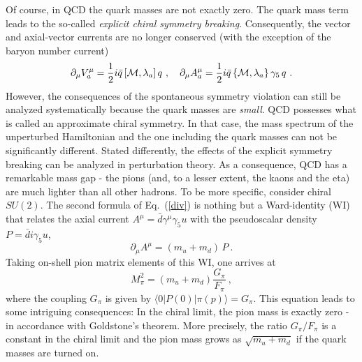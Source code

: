 \documentclass[aps,rmp,nofootinbib,twocolumn,floatfix]{revtex4}
\newcommand{\beq}{\begin{equation}}
\newcommand{\eeq}{\end{equation}}
\begin{document}
Of course, in QCD the quark masses are not exactly zero. The quark mass term leads
to the so-called {\em explicit chiral symmetry breaking}. Consequently, the
vector and axial-vector currents are no longer conserved (with the exception
of the baryon number current)
\beq\label{div}
\partial_\mu V_a^\mu = \dfrac{1}{2} i \bar q \, [{\cal M},\lambda_a ]\, q~, \quad
\partial_\mu A_a^\mu = \dfrac{1}{2} i \bar q \, \{{\cal M},\lambda_a \} \, \gamma_5\, q~.
\eeq
However, the consequences of the spontaneous symmetry violation  can still be
analyzed systematically because the quark masses are {\em small}. QCD
possesses what is called an approximate chiral symmetry. In that case, the mass spectrum
of the unperturbed Hamiltonian and the one including the quark masses can not be
significantly different. Stated differently, the effects of the explicit symmetry
breaking can be analyzed in perturbation theory. 
As a consequence, QCD has a remarkable mass gap
- the pions (and, to a lesser extent,
the kaons and the eta) are much lighter than all other hadrons.  To be more
specific, consider chiral $SU(2)$. The second formula of Eq.~(\ref{div}) is
nothing but a Ward-identity (WI) that relates the axial current $A^\mu =  \bar d
\gamma^\mu \gamma_5 u$ with the pseudoscalar density $P = \bar d i \gamma_5
u$,
\beq
\partial_\mu A^\mu = (m_u + m_d)\, P~.
\eeq
Taking on-shell pion matrix elements of this WI, one arrives at
\beq\label{pimass}
M_\pi^2 = (m_u + m_d) \frac{G_\pi}{F_\pi}~,
\eeq
where the coupling $G_\pi$ is given by $\langle 0 | P(0)| \pi(p)\rangle =
G_\pi $. This equation leads to some intriguing consequences: In
the chiral limit, the pion mass is exactly zero - in accordance with Goldstone's
theorem. More precisely, the ratio $G_\pi /F_\pi$ is a constant in the chiral
limit and the pion mass grows as $\sqrt{m_u+m_d}$ if the quark masses are
turned on. 
\end{document}
